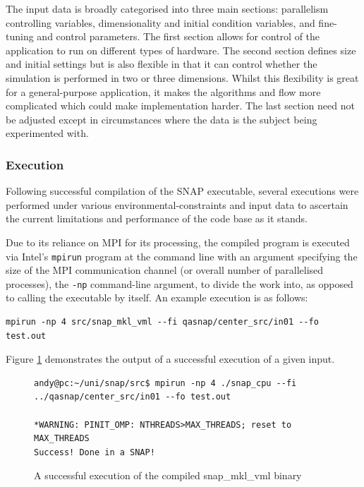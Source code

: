 \documentclass[conference]{IEEEtran}
\begin{document}
The input data is broadly categorised into three main sections: parallelism controlling variables, dimensionality and initial condition variables, and fine-tuning and control parameters. The first section allows for control of the application to run on different types of hardware. The second section defines size and initial settings but is also flexible in that it can control whether the simulation is performed in two or three dimensions. Whilst this flexibility is great for a general-purpose application, it makes the algorithms and flow more complicated which could make implementation harder. The last section need not be adjusted except in circumstances where the data is the subject being experimented with.

\subsubsection{Execution}

Following successful compilation of the SNAP executable, several executions were performed under various environmental-constraints and input data to ascertain the current limitations and performance of the code base as it stands.

Due to its reliance on MPI for its processing, the compiled program is executed via Intel's \texttt{mpirun} program at the command line with an argument specifying the size of the MPI communication channel (or overall number of parallelised processes), the \texttt{-np} command-line argument, to divide the work into, as opposed to calling the executable by itself. An example execution is as follows:

\begin{lstlisting}[breaklines]
mpirun -np 4 src/snap_mkl_vml --fi qasnap/center_src/in01 --fo test.out
\end{lstlisting}

Figure \ref{fig:snap-successful-run} demonstrates the output of a successful execution of a given input.

\begin{figure}[!h]
    \centering
    \begin{lstlisting}[breaklines]
andy@pc:~/uni/snap/src$ mpirun -np 4 ./snap_cpu --fi ../qasnap/center_src/in01 --fo test.out

*WARNING: PINIT_OMP: NTHREADS>MAX_THREADS; reset to MAX_THREADS
Success! Done in a SNAP!
    \end{lstlisting}
    \caption{A successful execution of the compiled snap\_mkl\_vml binary}
    \label{fig:snap-successful-run}
\end{figure}
\end{document}
